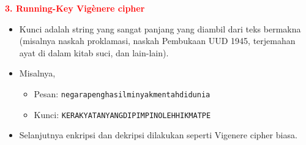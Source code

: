 \documentclass{article}
\begin{document}

\textcolor{red}{\textbf{3. Running-Key Vig\`enere cipher}}

\begin{itemize}
    \item Kunci adalah string yang sangat panjang yang diambil dari teks bermakna (misalnya naskah proklamasi, naskah Pembukaan UUD 1945, terjemahan ayat di dalam kitab suci, dan lain-lain).
    \item Misalnya,
    \begin{itemize}
        \item Pesan: \texttt{negarapenghasilminyakmentahdidunia}
        \item Kunci: \texttt{KERAKYATANYANGDIPIMPINOLEHHIKMATPE}
    \end{itemize}
    \item Selanjutnya enkripsi dan dekripsi dilakukan seperti Vigenere cipher biasa.
\end{itemize}
\end{document}
